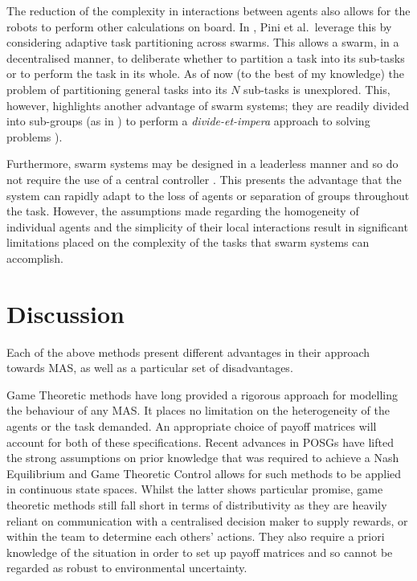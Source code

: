 \documentclass[.../main.tex]{subfiles}
\begin{document}


The reduction of the complexity in interactions between agents also
allows for the robots to perform other calculations on board. In
\cite{Pini2011TaskSelection}, Pini et al.~leverage this by considering
adaptive task partitioning across swarms. This allows a swarm, in a
decentralised manner, to deliberate whether to partition a task into
its sub-tasks or to perform the task in its whole. As of now (to the
best of my knowledge) the problem of partitioning general tasks into
its $N$ sub-tasks is unexplored. This, however, highlights another
advantage of swarm systems; they are readily divided into sub-groups
(as in \cite{Zahadat2016DivisionInhibition}) to perform a
{\em divide-et-impera}
approach to solving problems
\cite{Pini2011TaskSelection}).

Furthermore, swarm systems may be designed in a leaderless manner and
so do not require the use of a central controller
\cite{Couceiro2015}. This presents the advantage that the system can
rapidly adapt to the loss of agents or separation of groups throughout
the task. However, the assumptions made regarding the homogeneity of
individual agents and the simplicity of their local interactions
result in significant limitations placed on the complexity of the
tasks that swarm systems can accomplish.


\section{Discussion} \label{sec:remarks}


Each of the above methods present different advantages in their
approach towards MAS, as well as a particular set of disadvantages.

Game Theoretic methods have long provided a rigorous approach for
modelling the behaviour of any MAS. It places no limitation on the
heterogeneity of the agents or the task demanded. An appropriate
choice of payoff matrices will account for both of these
specifications. Recent advances in POSGs have lifted the strong
assumptions on prior knowledge that was required to achieve a Nash
Equilibrium and Game Theoretic Control allows for such methods to be
applied in continuous state spaces. Whilst the latter shows particular
promise, game theoretic methods still fall short in terms of
distributivity as they are heavily reliant on communication with a
centralised decision maker to supply rewards, or within the team to
determine each others' actions. They also require a priori knowledge
of the situation in order to set up payoff matrices and so cannot be
regarded as robust to environmental uncertainty.
\end{document}
